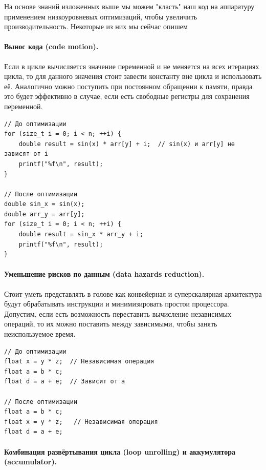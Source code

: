 \documentclass[12pt,a4paper]{article}
\begin{document}
На основе знаний изложенных выше мы можем "класть" наш код на аппаратуру применением низкоуровневых оптимизаций, чтобы увеличить производительность. Некоторые из них мы сейчас опишем


\paragraph{Вынос кода (code motion).}

Если в цикле вычисляется значение переменной и не меняется на всех итерациях цикла, то для данного значения стоит завести константу вне цикла и использовать её. Аналогично можно поступить при постоянном обращении к памяти, правда это будет эффективно в случае, если есть свободные регистры для сохранения переменной.

\newpage

\begin{verbatim}
// До оптимизации
for (size_t i = 0; i < n; ++i) {
    double result = sin(x) * arr[y] + i;  // sin(x) и arr[y] не зависят от i
    printf("%f\n", result);
}

// После оптимизации
double sin_x = sin(x);
double arr_y = arr[y];
for (size_t i = 0; i < n; ++i) {
    double result = sin_x * arr_y + i;
    printf("%f\n", result);
}
\end{verbatim}

\paragraph{Уменьшение рисков по данным (data hazards reduction).}

Стоит уметь представлять в голове как конвейерная и суперскалярная архитектура будут обрабатывать инструкции и минимизировать простои процессора. Допустим, если есть возможность переставить вычисление независимых операций, то их можно поставить между зависимыми, чтобы занять неиспользуемое время.

\begin{verbatim}
// До оптимизации
float x = y * z;  // Независимая операция
float a = b * c;
float d = a + e;  // Зависит от a

// После оптимизации
float a = b * c;
float x = y * z;   // Независимая операция
float d = a + e;
\end{verbatim}

\paragraph{Комбинация развёртывания цикла (loop unrolling) и аккумулятора (accumulator).}
\indent
\end{document}

